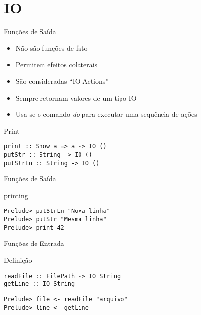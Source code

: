 \documentclass{beamer}
\begin{document}
	\section{IO}
	
	\begin{frame}{}
	\end{frame}
	
		\begin{frame}[fragile]{Funções de Saída}
		 \begin{itemize}
		  \item Não são funções de fato
		  \item Permitem efeitos colaterais
		  \item São consideradas ``IO Actions''
		  \item Sempre retornam valores de um tipo IO
		  \item Usa-se o comando \textit{do} para executar uma sequência de ações
		 \end{itemize}
		 
		 \begin{block}{Print}
		  \begin{lstlisting}
print :: Show a => a -> IO ()
putStr :: String -> IO ()
putStrLn :: String -> IO ()
		  \end{lstlisting}
		 \end{block}
		\end{frame}
		
		\begin{frame}[fragile]{Funções de Saída}
		 \begin{block}{printing}
		  \begin{lstlisting}
Prelude> putStrLn "Nova linha"
Prelude> putStr "Mesma linha"
Prelude> print 42
		  \end{lstlisting}
		 \end{block}
		\end{frame}
		
		\begin{frame}[fragile]{Funções de Entrada}

		 \begin{block}{Definição}
		  \begin{lstlisting}
readFile :: FilePath -> IO String
getLine :: IO String
		  \end{lstlisting}
		 \end{block}
		 
		 \begin{block}{}
		  \begin{lstlisting}
Prelude> file <- readFile "arquivo"
Prelude> line <- getLine
		  \end{lstlisting}
		 \end{block}		 
		\end{frame}
\end{document}
